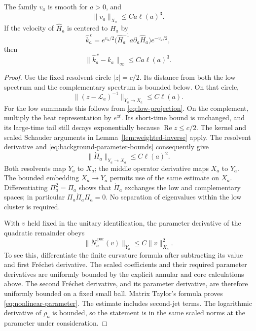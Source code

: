 \begin{proposition}\label{prop:correction-parameter}
The family \(v_a\) is smooth for \(a>0\), and
\begin{equation}\label{eq:correction-parameter}
 \|\dot v_a\|_{X_a}\le Ca\ell(a)^3.
\end{equation}
If the velocity of \(\widehat H_a\) is centered to \(H_a\) by
\[
 \widehat k_a^{\,c}
 =e^{v_a/2}\bigl(\widehat H_a^{-1}a\partial_a\widehat H_a\bigr)
     e^{-v_a/2},
\]
then
\begin{equation}\label{eq:corrected-tangent}
 \|\widehat k_a^{\,c}-k_a\|_\infty\le Ca\ell(a)^3.
\end{equation}
\end{proposition}

\begin{proof}
Use the fixed resolvent circle \(|z|=c/2\). Its distance from
both the low spectrum and the complementary spectrum is
bounded below. On that circle,
\[
 \|(z-\mathcal L_a)^{-1}\|_{Y_a\to X_a}\le C\ell(a).
\]
For the low summands this follows from
\eqref{eq:low-projection}. On the complement, multiply the
heat representation by \(e^{zt}\). Its short-time bound is
unchanged, and its large-time tail still decays exponentially
because \(\operatorname{Re}z\le c/2\). The kernel and scaled
Schauder arguments in Lemma~\ref{lem:weighted-inverse} apply.
The resolvent derivative and
\eqref{eq:background-parameter-bounds} consequently give
\begin{equation}\label{eq:projection-derivative}
 \|\dot\Pi_a\|_{Y_a\to X_a}\le C\ell(a)^2.
\end{equation}
Both resolvents map \(Y_a\) to \(X_a\); the middle
operator derivative maps \(X_a\) to \(Y_a\).
The bounded embedding \(X_a\to Y_a\) permits use of
the same estimate on \(X_a\). Differentiating
\(\Pi_a^2=\Pi_a\) shows that \(\dot\Pi_a\) exchanges
the low and complementary spaces; in particular
\(\Pi_a\dot\Pi_a\Pi_a=0\). No separation of eigenvalues
within the low cluster is required.

With \(v\) held fixed in the unitary identification, the
parameter derivative of the quadratic remainder obeys
\begin{equation}\label{eq:nonlinear-parameter}
 \|\dot N_a^{\,\mathrm{par}}(v)\|_{Y_a}\le C\|v\|_{X_a}^2.
\end{equation}
To see this, differentiate the finite curvature formula
after subtracting its value and first Fréchet derivative.
The scaled coefficients and their required parameter
derivatives are uniformly bounded by the explicit annular
and core calculations above. The second Fréchet derivative,
and its parameter derivative, are therefore uniformly
bounded on a fixed small ball. Matrix Taylor's formula
proves \eqref{eq:nonlinear-parameter}. The estimate includes
second-jet terms. The logarithmic derivative of \(\rho_a\)
is bounded, so the statement is in the same scaled norms
at the parameter under consideration.


\end{proof}
